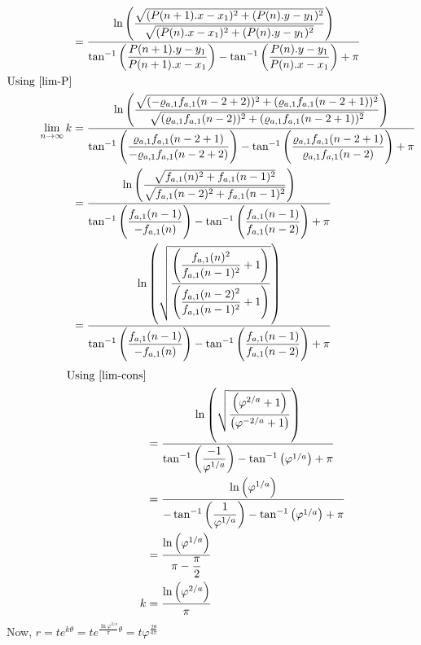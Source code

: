 \documentclass[preprint,12pt]{elsarticle}
\begin{document}
\begin{align*}
&= \dfrac{\ln{\left(\dfrac{\sqrt{(P(n+1).x -x_1)^2 + (P(n).y - y_1)^2}}{\sqrt{(P(n).x -x_1)^2 + (P(n).y - y_1)^2}}\right)}}{\tan^{-1}\left({\dfrac{P(n+1).y - y_1}{P(n+1).x - x_1}}\right) - \tan^{-1}\left({\dfrac{P(n).y - y_1}{P(n).x - x_1}}\right)+ \pi}\\
\text{Using \ref{lim-P}}\\
\lim_{n \to \infty} k&= \dfrac{\ln{\left(\dfrac{\sqrt{(-\varrho_{a,1}f_{a,1}(n-2+2))^2 + (\varrho_{a,1}f_{a,1}(n-2+1))^2}}{\sqrt{(\varrho_{a,1}f_{a,1}(n-2))^2 + (\varrho_{a,1}f_{a,1}(n-2+1))^2}}\right)}}{\tan^{-1}\left({\dfrac{\varrho_{a,1}f_{a,1}(n-2+1)}{-\varrho_{a,1}f_{a,1}(n-2+2)}}\right) - \tan^{-1}\left({\dfrac{\varrho_{a,1}f_{a,1}(n-2+1)}{\varrho_{a,1}f_{a,1}(n-2)}}\right)+ \pi}\\
&=\dfrac{\ln{\left(\dfrac{\sqrt{f_{a,1}(n)^2 + f_{a,1}(n-1)^2}}{\sqrt{f_{a,1}(n-2)^2 + f_{a,1}(n-1)^2}}\right)}}{\tan^{-1}\left({\dfrac{f_{a,1}(n-1)}{-f_{a,1}(n)}}\right) - \tan^{-1}\left({\dfrac{f_{a,1}(n-1)}{f_{a,1}(n-2)}}\right)+ \pi}\\
&=\dfrac{\ln{\left(\sqrt{\dfrac{\left(\dfrac{f_{a,1}(n)^2}{f_{a,1}(n-1)^2} +1\right)}{\left(\dfrac{f_{a,1}(n-2)^2}{f_{a,1}(n-1)^2}+1\right)}}\right)}}{\tan^{-1}\left({\dfrac{f_{a,1}(n-1)}{-f_{a,1}(n)}}\right) - \tan^{-1}\left({\dfrac{f_{a,1}(n-1)}{f_{a,1}(n-2)}}\right)+ \pi}
\end{align*}
\begin{align*}
	\text{Using \ref{lim-cons}}\\
	&=\dfrac{\ln{\left(\sqrt{\dfrac{\left(\varphi^{2/a} +1\right)}{\left(\varphi^{-2/a}+1\right)}}\right)}}{\tan^{-1}\left({\dfrac{-1}{\varphi^{1/a}}}\right) - \tan^{-1}\left({\varphi^{1/a}}\right)+ \pi}\\
	&=\dfrac{\ln{\left(\varphi^{1/a}\right)}}{-\tan^{-1}\left({\dfrac{1}{\varphi^{1/a}}}\right) - \tan^{-1}\left({\varphi^{1/a}}\right)+ \pi}\\
	&=\dfrac{\ln{\left(\varphi^{1/a}\right)}}{\pi - \dfrac{\pi}{2}}\\
	k &= \dfrac{\ln{\left(\varphi^{2/a}\right)}}{\pi}
\end{align*}
Now, 
{\large$r = te^{k\theta} = 
	te^{\frac{\ln{\varphi^{2/a}}}{\pi}\theta} = t\varphi^{\frac{2\theta}{a\pi}}$}
\end{document}
